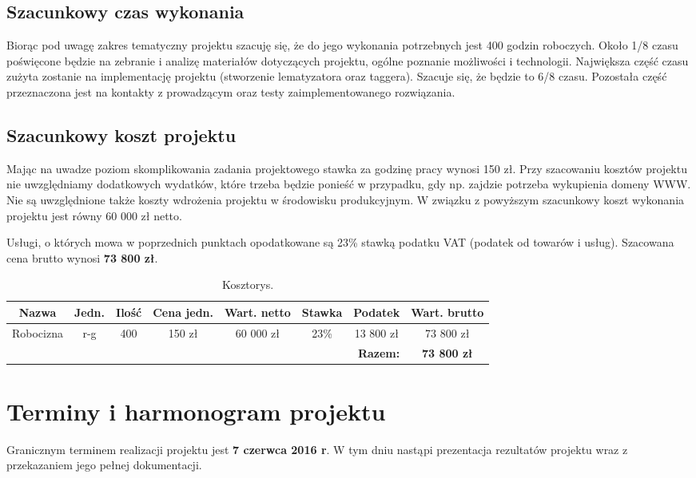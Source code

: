 \subsection*{Szacunkowy czas wykonania}
Biorąc pod uwagę zakres tematyczny projektu szacuję się, że do jego wykonania potrzebnych jest 400 godzin roboczych. Około 1/8 czasu poświęcone będzie na zebranie i analizę materiałów dotyczących projektu, ogólne poznanie możliwości i technologii. Największa część czasu zużyta zostanie na implementację projektu (stworzenie lematyzatora oraz taggera). Szacuje się, że będzie to 6/8 czasu. Pozostała część przeznaczona jest na kontakty z prowadzącym oraz testy zaimplementowanego rozwiązania.

\subsection*{Szacunkowy koszt projektu}
Mając na uwadze poziom skomplikowania zadania projektowego stawka za godzinę pracy wynosi 150 zł. Przy szacowaniu kosztów projektu nie uwzględniamy dodatkowych wydatków, które trzeba będzie ponieść w przypadku, gdy np. zajdzie potrzeba wykupienia domeny WWW. Nie są uwzględnione także koszty wdrożenia projektu w środowisku produkcyjnym. W związku z powyższym szacunkowy koszt wykonania projektu jest równy 60 000 zł netto.

Usługi, o których mowa w poprzednich punktach opodatkowane są 23\% stawką podatku VAT (podatek od towarów i usług). Szacowana cena brutto wynosi \textbf{73 800 zł}.

\begin{table}[H]
	\centering
	\caption{Kosztorys.}
	\smallskip
	\begin{tabular}{cccccccc}
		\toprule
		\textbf{Nazwa} & \textbf{Jedn.} & \textbf{Ilość} & \textbf{Cena jedn.} & \textbf{Wart. netto} & \textbf{Stawka} & \textbf{Podatek} & \textbf{Wart. brutto} \\
		\midrule
		Robocizna & r-g & 400 & 150 zł & 60 000 zł & 23\% & 13 800 zł & 73 800 zł \\
		\bottomrule
		\multicolumn{7}{r}{\bf Razem:} & \textbf{73 800 zł} \\
	\end{tabular}
\end{table}

\section{Terminy i harmonogram projektu}
Granicznym terminem realizacji projektu jest \textbf{7 czerwca 2016 r}. W tym dniu nastąpi prezentacja rezultatów projektu wraz z przekazaniem jego pełnej dokumentacji.

